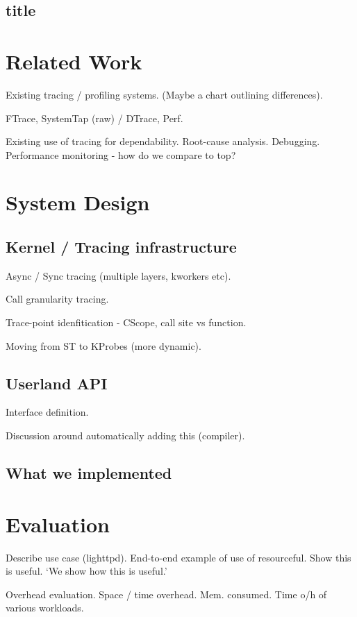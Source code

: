 \documentclass[letterpaper,twocolumn,10pt]{article}
\begin{document}
\subsection{title}		


\section{Related Work}
Existing tracing / profiling systems. (Maybe a chart outlining differences).

FTrace, SystemTap (raw) / DTrace, Perf.

Existing use of tracing for dependability.\newline
Root-cause analysis. Debugging. Performance monitoring - how do we compare to
top?


\section{System Design}
\subsection{Kernel / Tracing infrastructure}
Async / Sync tracing (multiple layers, kworkers etc).

Call granularity tracing.

Trace-point idenfitication - CScope, call site vs function.

Moving from ST to KProbes (more dynamic).

\subsection{Userland API}
Interface definition.

Discussion around automatically adding this (compiler).

\subsection{What we implemented}


\section{Evaluation}
Describe use case (lighttpd).\newline
End-to-end example of use of resourceful. Show this is useful. `We show how this
is useful.'

Overhead evaluation.\newline
Space / time overhead. Mem. consumed. Time o/h of various workloads.
\end{document}
